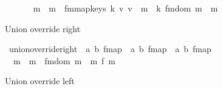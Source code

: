 \begin{isabellebody}
\ \ {\isacharparenleft}{\kern0pt}\ {\isacartoucheopen}{\isasyminter}\isactrlsub {\isacharplus}{\kern0pt}{\isacartoucheclose}\ {}{}{}{\isacharparenright}{\kern0pt}\isanewline
{}\isanewline
\ \ {\isachardoublequoteopen}m\ {\isasyminter}\isactrlsub {\isacharplus}{\kern0pt}\ m\ {\isasymequiv}\ fmmap{\isacharunderscore}{\kern0pt}keys\ {\isacharparenleft}{\kern0pt}{\isasymlambda}k\ v{\isachardot}{\kern0pt}\ v\ {\isacharplus}{\kern0pt}\ m\ {\isachardollar}{\kern0pt}{\isachardollar}{\kern0pt}{\isacharbang}{\kern0pt}\ k{\isacharparenright}{\kern0pt}\ {\isacharparenleft}{\kern0pt}fmdom{\isacharprime}{\kern0pt}\ m\ {\isasymlhd}\ m%
\begin{isamarkuptext}%
Union override right%
\end{isamarkuptext}\isamarkuptrue%
\isamarkupfalse%
\ union{\isacharunderscore}{\kern0pt}override{\isacharunderscore}{\kern0pt}right\ {\isacharcolon}{\kern0pt}{\isacharcolon}{\kern0pt}\ {\isachardoublequoteopen}{\isacharparenleft}{\kern0pt}{\isacharprime}{\kern0pt}a{\isacharcomma}{\kern0pt}\ {\isacharprime}{\kern0pt}b{\isacharparenright}{\kern0pt}\ fmap\ {\isasymRightarrow}\ {\isacharparenleft}{\kern0pt}{\isacharprime}{\kern0pt}a{\isacharcomma}{\kern0pt}\ {\isacharprime}{\kern0pt}b{\isacharparenright}{\kern0pt}\ fmap\ {\isasymRightarrow}\ {\isacharparenleft}{\kern0pt}{\isacharprime}{\kern0pt}a{\isacharcomma}{\kern0pt}\ {\isacharprime}{\kern0pt}b{\isacharparenright}{\kern0pt}\ fmap{\isachardoublequoteclose}\isanewline
\ \ {\isacharparenleft}{\kern0pt}\ {\isacartoucheopen}{\isasymunion}\isactrlsub {\isasymrightarrow}{\isacartoucheclose}\ {}{}{}{\isacharparenright}{\kern0pt}\isanewline
{}\isanewline
\ \ {\isachardoublequoteopen}m\ {\isasymunion}\isactrlsub {\isasymrightarrow}\ m\ {\isasymequiv}\ {\isacharparenleft}{\kern0pt}fmdom{\isacharprime}{\kern0pt}\ m\ {\isasymlhd}{\isacharslash}{\kern0pt}\ m\ {\isacharplus}{\kern0pt}{\isacharplus}{\kern0pt}\isactrlsub f\ m%
\begin{isamarkuptext}%
Union override left%
\end{isamarkuptext}\isamarkuptrue%

\end{isabellebody}
